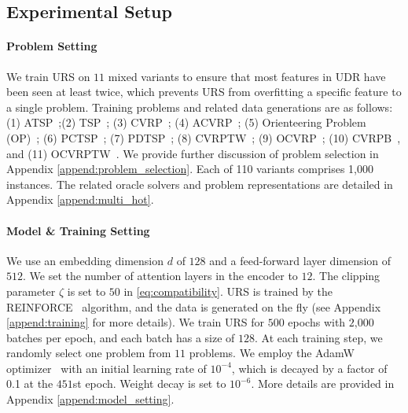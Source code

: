 \documentclass{article}
\theoremstyle{plain}
\theoremstyle{definition}
\theoremstyle{remark}
\begin{document}
\subsection{Experimental Setup}

\paragraph{Problem Setting} 
We train URS on $11$ mixed variants to ensure that most features in UDR have been seen at least twice, which prevents URS from overfitting a specific feature to a single problem. Training problems and related data generations are as follows: (1) ATSP~\citep{kwon2021matnet};(2) TSP~\citep{kool2019attention}; (3) CVRP~\citep{kool2019attention}; (4) ACVRP~\citep{kwon2021matnet,kool2019attention}; (5) Orienteering Problem (OP)~\citep{kool2019attention}; (6) PCTSP~\citep{kool2019attention}; (7) PDTSP~\citep{li2021pdtsp}; (8) CVRPTW~\citep{zhou2024mvmoe}; (9) OCVRP~\citep{zhou2024mvmoe}; (10) CVRPB~\citep{zhou2024mvmoe}, and (11) OCVRPTW~\citep{zhou2024mvmoe}. We provide further discussion of problem selection in Appendix \ref{append:problem_selection}. Each of 110 variants comprises 1,000 instances. The related oracle solvers and problem representations are detailed in Appendix \ref{append:multi_hot}.

\paragraph{Model \& Training Setting}
\label{sec:exp_model_setting}
We use an embedding dimension $d$ of $128$ and a feed-forward layer dimension of $512$. We set the number of attention layers in the encoder to $12$. The clipping parameter $\zeta$ is set to $50$ in \cref{eq:compatibility}. URS is trained by the REINFORCE~\citep{williams1992reinforce} algorithm, and the data is generated on the fly (see Appendix \ref{append:training} for more details). We train URS for $500$ epochs with $2\text{,}000$ batches per epoch, and each batch has a size of $128$. At each training step, we randomly select one problem from $11$ problems. We employ the AdamW optimizer~\citep{loshchilov2017adamw} with an initial learning rate of $10^{-4}$, which is decayed by a factor of 0.1 at the $451$st epoch. Weight decay is set to $10^{-6}$. More details are provided in Appendix \ref{append:model_setting}.
\end{document}
